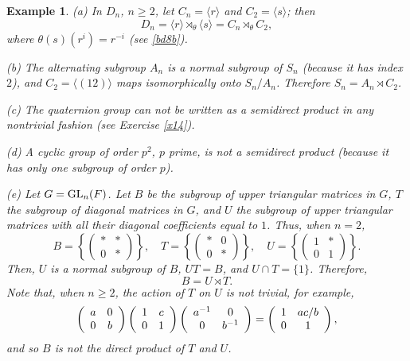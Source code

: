 \documentclass[a4paper,11pt,final]{memoir}%
\newtheorem{example}[X]{Example}
\theoremstyle{nonumberplain}
\begin{document}
\begin{example}
\label{it14}(a) In $D_{n}$, $n\geq2$, let $C_{n}=\langle r\rangle$ and
$C_{2}=\langle s\rangle$; then
\[
D_{n}=\langle r\rangle\rtimes_{\theta}\langle s\rangle=C_{n}\rtimes_{\theta
}C_{2},
\]
where $\theta(s)(r^{i})=r^{-i}$ (see \ref{bd8b}).

(b) The alternating subgroup $A_{n}$ is a normal subgroup of $S_{n}$ (because
it has index $2$), and $C_{2}=\langle(12)\rangle$ maps isomorphically onto
$S_{n}/A_{n}$. Therefore $S_{n}=A_{n}\rtimes C_{2}$.

(c) The quaternion group can not be written as a semidirect product in any
nontrivial fashion (see Exercise \ref{x14}).

(d) A cyclic group of order $p^{2}$, $p$ prime, is not a semidirect product
(because it has only one subgroup of order $p$).

(e) Let $G=\operatorname{GL}_{n}(F)$. Let $B$ be the subgroup of upper triangular matrices
in $G$, $T$ the subgroup of diagonal matrices in $G$, and $U$ the subgroup of
upper triangular matrices with all their diagonal coefficients equal to $1$.
Thus, when $n=2$,%
\[
B=\left\{
\begin{pmatrix}
\ast & \ast\\
0 & \ast
\end{pmatrix}
\right\}  ,\quad T=\left\{
\begin{pmatrix}
\ast & 0\\
0 & \ast
\end{pmatrix}
\right\}  ,\quad U=\left\{
\begin{pmatrix}
1 & \ast\\
0 & 1
\end{pmatrix}
\right\}  \text{.}%
\]
Then, $U$ is a normal subgroup of $B$, $UT=B$, and $U\cap T=\{1\}$. Therefore,%
\[
B=U\rtimes T\text{.}%
\]
Note that, when $n\geq2$, the action of $T$ on $U$ is not trivial, for
example,%
\[
\left(
\begin{array}
[c]{cc}%
a & 0\\
0 & b
\end{array}
\right)  \left(
\begin{array}
[c]{cc}%
1 & c\\
0 & 1
\end{array}
\right)  \left(
\begin{array}
[c]{cc}%
a^{-1} & 0\\
0 & b^{-1}%
\end{array}
\right)  =\left(
\begin{array}
[c]{cc}%
1 & ac/b\\
0 & 1
\end{array}
\right)  ,
\]
and so $B$ is not the direct product of $T$ and $U$.
\end{example}
\end{document}
